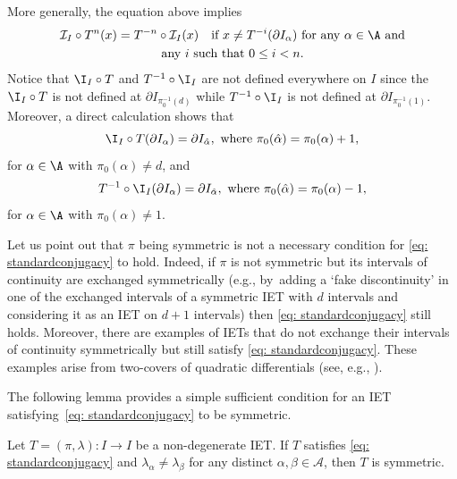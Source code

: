 \pagebreak[2]
More generally, the equation above implies
\begin{multline}
\label{eq:generalized_conjugacy}
\mathcal{I}_I\circ T^n(x)=T^{-n}\circ\mathcal{I}_I(x) \quad \text{if } x \neq T^{-i}(\partial I_\alpha) \text{ for any } \alpha \in \A \text{ and}\\ \text{any $i$ such that } 0 \leq i < n.
\end{multline}
{Notice that $\I_I\circ T$ and $T^{-1}\circ \I_I$ are not defined everywhere on $I$ since the $\I_I\circ T$ is not defined at $\partial I_{\pi_0^{-1}(d)}$ while $T^{-1}\circ \I_I$ is not defined at $\partial I_{\pi_0^{-1}(1)}$.}
Moreover, {a direct calculation shows that}
\begin{equation}
\label{eq:sym_identity_endpoints}
\I_I\circ T(\partial I_{\alpha})=\partial I_{\hat\alpha},\ \text{where}\ \pi_0(\hat\alpha)=\pi_0(\alpha)+1,
\end{equation}
for $\alpha\in\A$ with $\pi_0(\alpha)\neq d$, and
\begin{equation}\label{eq:sym_identity_endpoints_2}
T^{-1}\circ \I_I(\partial I_{\alpha})=\partial I_{\hat\alpha},\ \text{where}\ \pi_0(\hat\alpha)=\pi_0(\alpha)-1,
\end{equation}
for $\alpha\in\A$ with $\pi_0(\alpha)\neq 1$.

Let us point out that $\pi$ being symmetric is not a necessary condition for \eqref{eq: standardconjugacy} to hold. Indeed, if $\pi$ is not symmetric but its intervals of continuity are exchanged symmetrically {(e.g., by~adding a `fake discontinuity' in one of the exchanged intervals of a symmetric IET with $d$ intervals and considering it as an IET on $d + 1$ intervals)} then \eqref{eq: standardconjugacy} still holds. Moreover, there are examples of IETs that do not exchange their intervals of continuity symmetrically but still satisfy \eqref{eq: standardconjugacy}. These examples arise from two-covers of quadratic differentials {(see, e.g., \cite{boissy_dynamics_2009}}).

The following lemma provides a simple sufficient condition for an IET satisfying~\eqref{eq: standardconjugacy} to be symmetric.

\begin{lemma}
\label{lem: condition for symmetric iets,}
Let $T=(\pi,\lambda): I \to I$ be a non-degenerate IET. If $T$ satisfies
\eqref{eq: standardconjugacy}
and $\lambda_{\alpha}\neq \lambda_{\beta}$ for any distinct $\alpha, \beta \in \mathcal{A}$, then $T$ is symmetric.
\end{lemma}

